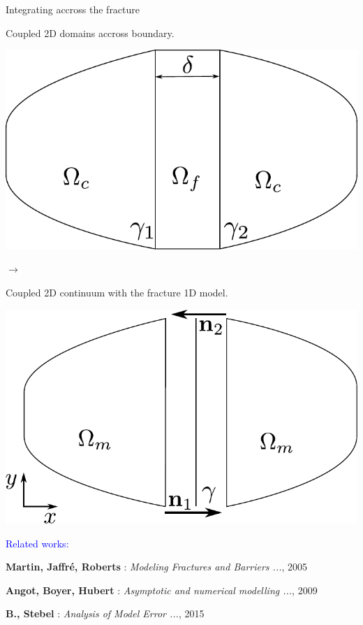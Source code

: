 \documentclass[10pt]{beamer} %
\begin{document}
\begin{frame}{Integrating accross the fracture}
    \begin{minipage}{0.40\textwidth}
    Coupled 2D domains accross boundary.
    \begin{center}
        \includegraphics[width=\linewidth]{graphics/continuum_model_domain.pdf}
    \end{center}    
    \end{minipage}
    \hspace{1ex}$\longrightarrow$\hspace{1ex}
    \begin{minipage}{0.40\textwidth}
        Coupled 2D continuum with the fracture 1D model.
        \begin{center}
                \includegraphics[width=\linewidth]{graphics/fracture_model_domain.pdf}
        \end{center}
    \end{minipage}
    
    \vspace{2ex}
    \textcolor{blue}{Related works:}\\
    {\small
    {\bf Martin, Jaffr{\'e}, Roberts} : {\it Modeling Fractures and Barriers ...}, 2005

    \vspace{1ex}
    {\bf Angot, Boyer, Hubert} : {\it Asymptotic and numerical modelling ...}, 2009
    
    \vspace{1ex}
    {\bf B., Stebel} :  {\it Analysis of Model Error ...}, 2015
    }    
\end{frame}
\end{document}
